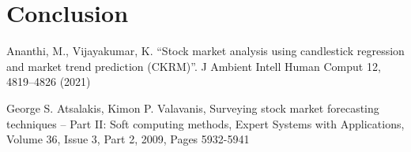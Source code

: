 \documentclass[conference]{IEEEtran}
\begin{document}
\section{Conclusion}
\label{conclusion}

\begin{thebibliography}{00}
 Ananthi, M., Vijayakumar, K. ``Stock market analysis using candlestick regression and market trend prediction (CKRM)''. J Ambient Intell Human Comput 12, 4819–4826 (2021)

 George S. Atsalakis, Kimon P. Valavanis, Surveying stock market forecasting techniques – Part II: Soft computing methods, Expert Systems with Applications, Volume 36, Issue 3, Part 2, 2009, Pages 5932-5941

\end{thebibliography}
\end{document}
